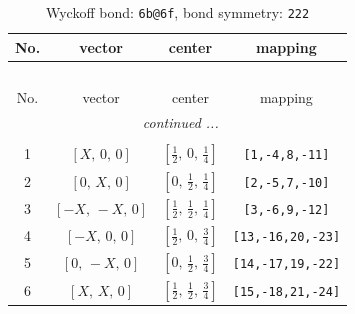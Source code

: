 \documentclass[fleqn,8pt]{jsarticle}
\begin{document}
\renewcommand{\arraystretch}{1.2}
\begin{longtable}{cccc}
\caption{Wyckoff bond: {\tt 6b@6f}, bond symmetry: {\tt 222}}
 \\
 \hline \hline
No. & vector & center & mapping \\ \hline \endfirsthead

\multicolumn{3}{l}{\tablename\ \thetable{}} \\
 \hline \hline
No. & vector & center & mapping \\ \hline \endhead

 \hline \hline
\multicolumn{3}{r}{\footnotesize\it continued ...} \\ \endfoot

 \hline \hline
\multicolumn{3}{r}{} \\ \endlastfoot

1 & $\left[ X,\, 0,\, 0 \right]$ & $\left[ \frac{1}{2},\, 0,\, \frac{1}{4} \right]$ & {\tt [1,-4,8,-11]} \\ \hline
2 & $\left[ 0,\, X,\, 0 \right]$ & $\left[ 0,\, \frac{1}{2},\, \frac{1}{4} \right]$ & {\tt [2,-5,7,-10]} \\ \hline
3 & $\left[ - X,\, - X,\, 0 \right]$ & $\left[ \frac{1}{2},\, \frac{1}{2},\, \frac{1}{4} \right]$ & {\tt [3,-6,9,-12]} \\ \hline
4 & $\left[ - X,\, 0,\, 0 \right]$ & $\left[ \frac{1}{2},\, 0,\, \frac{3}{4} \right]$ & {\tt [13,-16,20,-23]} \\ \hline
5 & $\left[ 0,\, - X,\, 0 \right]$ & $\left[ 0,\, \frac{1}{2},\, \frac{3}{4} \right]$ & {\tt [14,-17,19,-22]} \\ \hline
6 & $\left[ X,\, X,\, 0 \right]$ & $\left[ \frac{1}{2},\, \frac{1}{2},\, \frac{3}{4} \right]$ & {\tt [15,-18,21,-24]} \\
\end{longtable}
\renewcommand{\arraystretch}{1.2}
\end{document}
